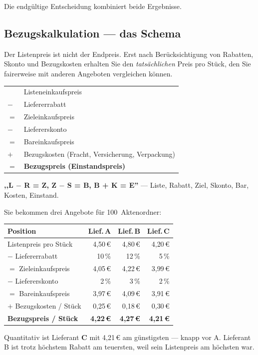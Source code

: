 \documentclass[11pt, a4paper]{article}
\begin{document}
Die endgültige Entscheidung kombiniert beide Ergebnisse.

\subsection{Bezugskalkulation --- das Schema}

Der Listenpreis ist nicht der Endpreis. Erst nach Berücksichtigung von Rabatten,
Skonto und Bezugskosten erhalten Sie den \emph{tatsächlichen} Preis pro Stück, den
Sie fairerweise mit anderen Angeboten vergleichen können.

\begin{merksatz}[title={Berechnungs­schema}]
\setlength{\tabcolsep}{4pt}
\begin{tabular}{ll}
& Listeneinkaufspreis\\
$-$ & Liefererrabatt\\
$=$ & Zieleinkaufspreis\\
$-$ & Liefererskonto\\
$=$ & Bareinkaufspreis\\
$+$ & Bezugskosten (Fracht, Versicherung, Verpackung)\\
$=$ & \textbf{Bezugspreis (Einstandspreis)}\\
\end{tabular}
\end{merksatz}

\begin{eselsbruecke}
\textbf{,,L $-$ R = Z, Z $-$ S = B, B + K = E''} --- Liste, Rabatt, Ziel, Skonto, Bar, Kosten, Einstand.
\end{eselsbruecke}

\begin{beispiel}
Sie bekommen drei Angebote für 100~Aktenordner:

\begin{center}
\begin{tabular}{lrrr}
\toprule
\textbf{Position} & \textbf{Lief.\,A} & \textbf{Lief.\,B} & \textbf{Lief.\,C}\\
\midrule
Listenpreis pro Stück & 4{,}50\,€ & 4{,}80\,€ & 4{,}20\,€\\
$-$ Liefererrabatt & 10\,\% & 12\,\% & 5\,\%\\
$=$ Zieleinkaufspreis & 4{,}05\,€ & 4{,}22\,€ & 3{,}99\,€\\
$-$ Liefererskonto & 2\,\% & 3\,\% & 2\,\%\\
$=$ Bareinkaufspreis & 3{,}97\,€ & 4{,}09\,€ & 3{,}91\,€\\
$+$ Bezugskosten / Stück & 0{,}25\,€ & 0{,}18\,€ & 0{,}30\,€\\
\midrule
\textbf{Bezugspreis / Stück} & \textbf{4{,}22\,€} & \textbf{4{,}27\,€} & \textbf{4{,}21\,€}\\
\bottomrule
\end{tabular}
\end{center}

Quantitativ ist Lieferant \textbf{C} mit 4{,}21\,€ am günstigsten --- knapp vor A.
Lieferant B ist trotz höchstem Rabatt am teuersten, weil sein Listenpreis am höchsten war.
\end{beispiel}
\end{document}

